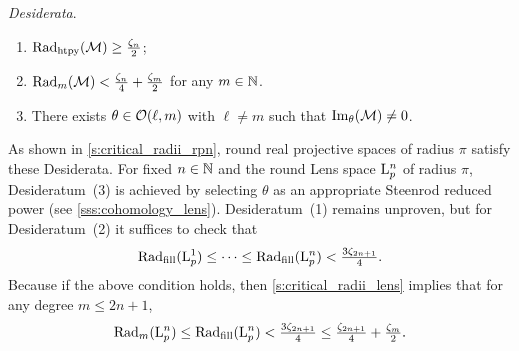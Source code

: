 \medskip\noindent\textit{\darkblue Desiderata}.\
\begin{enumerate}
    \item $\mathrm{Rad}_{\mathrm{htpy}}(\mathcal{M}) \geq \tfrac{\zeta_n}{2} $;
    \item $\mathrm{Rad}_{m}(\mathcal{M}) < \tfrac{\zeta_n}{4}+\tfrac{\zeta_m}{2}$ for any $m \in \mathbb{N}$.
    \item There exists $\theta \in \mathcal{O}(\ell, m)$ with \(\ell \neq m\) such that $\operatorname{Im}_\theta(\mathcal{M}) \neq 0$.
\end{enumerate}

\medskip As shown in \cref{s:critical_radii_rpn}, round real projective spaces of radius \(\pi\) satisfy these Desiderata.
For fixed $n\in \mathbb{N}$ and the round Lens space $\mathrm{L}^n_p$ of radius \(\pi\), Desideratum~(3) is achieved by selecting $\theta$ as an appropriate Steenrod reduced power (see \cref{sss:cohomology_lens}).
Desideratum~(1) remains unproven, but for Desideratum~(2) it suffices to check that
\[
\mathrm{Rad}_{\mathrm{fill}}(\mathrm{L}^1_p) \leq \dotsb \leq \mathrm{Rad}_{\mathrm{fill}}(\mathrm{L}^n_p) < \tfrac{3\zeta_{2n+1}}{4}.
\]
Because if the above condition holds, then \cref{s:critical_radii_lens} implies that for any degree $m \leq 2n+1$, 
\[
\mathrm{Rad}_{m}(\mathrm{L}^n_p) \leq \mathrm{Rad}_{\mathrm{fill}}(\mathrm{L}^n_p) < \tfrac{3\zeta_{2n+1}}{4} \leq \tfrac{\zeta_{2n+1}}{4} + \tfrac{\zeta_{m}}{2}. 
\]


\subsubsection{}

